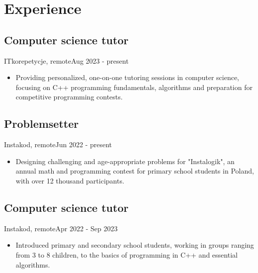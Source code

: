 \section{Experience}
\subsection{Computer science tutor}{ITkorepetycje, remote}{Aug 2023 - present}
\begin{itemize}
    \item Providing personalized, one-on-one tutoring sessions in computer science, focusing on C++ programming fundamentals, algorithms and preparation for competitive programming contests.
\end{itemize}

\subsection{Problemsetter}{Instakod, remote}{Jun 2022  - present}
\begin{itemize}
    \item Designing challenging and age-appropriate problems for "Instalogik", an annual math and programming contest for primary school students in Poland, with over 12 thousand participants.
\end{itemize}

\subsection{Computer science tutor}{Instakod, remote}{Apr 2022  - Sep 2023}
\begin{itemize}
    \item Introduced primary and secondary school students, working in groups ranging from 3 to 8 children, to the basics of programming in C++ and essential algorithms.
\end{itemize}

\vspace{1em}
